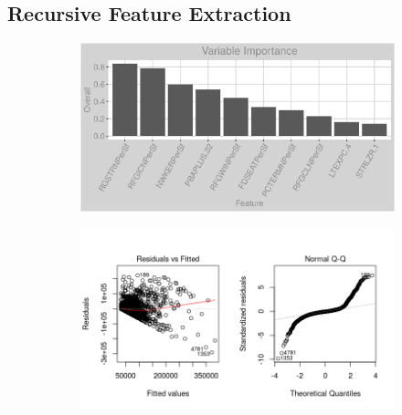 \subsection{Recursive Feature Extraction}
\label{appendix:electricity:rfe}
\begin{figure}[h]
\centering
\begin{subfigure}{1\textwidth}
\centering
\includegraphics[width=.99\textwidth, height=0.35\textheight]{Images/electricity_psf_rfe_vars.png}
\end{subfigure}
\begin{subfigure}{1\textwidth}
\centering
\includegraphics[width=.99\textwidth, height=0.4\textheight]{Images/electricity_psf_rfe_res_1.png}
\end{subfigure}
\end{figure}
\FloatBarrier
\newpage
